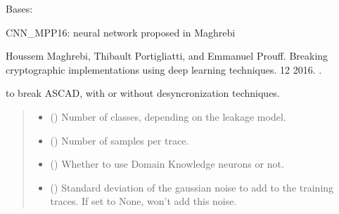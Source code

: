\documentclass[letterpaper,10pt,english]{sphinxmanual}
\begin{document}
\begin{fulllineitems}
\label{\detokenize{MLSCAlib.Architectures:MLSCAlib.Architectures.torch_models.CNN_MPP16}}
\pysigstartsignatures
{}
\pysigstopsignatures
\sphinxAtStartPar
Bases: 

\sphinxAtStartPar
CNN\_MPP16: neural network proposed in Maghrebi %
\begin{footnote}[2]\sphinxAtStartFootnote
Houssem Maghrebi, Thibault Portigliatti, and Emmanuel Prouff. Breaking cryptographic implementations using deep learning techniques. 12 2016. .
%
\end{footnote} to break ASCAD, with or without desyncronization techniques.
\begin{quote}\begin{description}
\begin{itemize}
\item {} 
\sphinxAtStartPar
{} () \textendash{} Number of classes, depending on the leakage model.

\item {} 
\sphinxAtStartPar
{} () \textendash{} Number of samples per trace.

\item {} 
\sphinxAtStartPar
{} (\sphinxstyleliteralemphasis{\sphinxupquote{, }}) \textendash{} Whether to use Domain Knowledge neurons or not.

\item {} 
\sphinxAtStartPar
{} (\sphinxstyleliteralemphasis{\sphinxupquote{, }}) \textendash{} Standard deviation of the gaussian noise to add to the training traces. If set
to None, won’t add this noise.


\end{itemize}
\end{description}
\end{quote}
\end{fulllineitems}
\end{document}
